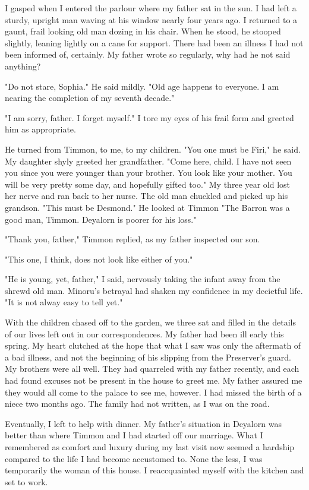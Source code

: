 \documentclass{article}
\begin{document}
I gasped when I entered the parlour where my father sat in the sun. I had left a sturdy, upright man waving at his window nearly four years ago. I returned to a gaunt, frail looking old man dozing in his chair. When he stood, he stooped slightly, leaning lightly on a cane for support. There had been an illness I had not been informed of, certainly. My father wrote so regularly, why had he not said anything?

"Do not stare, Sophia." He said mildly. "Old age happens to everyone. I am nearing the completion of my seventh decade."

"I am sorry, father. I forget myself." I tore my eyes of his frail form and greeted him as appropriate. 

He turned from Timmon, to me, to my children. "You one must be Firi," he said. My daughter shyly greeted her grandfather. "Come here, child. I have not seen you since you were younger than your brother. You look like your mother. You will be very pretty some day, and hopefully gifted too." My three year old lost her nerve and ran back to her nurse. The old man chuckled and picked up his grandson. "This must be Desmond." He looked at Timmon "The Barron was a good man, Timmon. Deyalorn is poorer for his loss." 

"Thank you, father," Timmon replied, as my father inspected our son.

"This one, I think, does not look like either of you." 

"He is young, yet, father," I said, nervously taking the infant away from the shrewd old man. Minoru's betrayal had shaken my confidence in my decietful life. "It is not alway easy to tell yet."

With the children chased off to the garden, we three sat and filled in the details of our lives left out in our correspondences. My father had been ill early this spring. My heart clutched at the hope that what I saw was only the aftermath of a bad illness, and not the beginning of his slipping from the Preserver's guard. My brothers were all well. They had quarreled with my father recently, and each had found excuses not be present in the house to greet me. My father assured me they would all come to the palace to see me, however. I had missed the birth of a niece two months ago. The family had not written, as I was on the road.

Eventually, I left to help with dinner. My father's situation in Deyalorn was better than where Timmon and I had started off our marriage. What I remembered as comfort and luxury during my last visit now seemed a hardship compared to the life I had become accustomed to. None the less, I was temporarily the woman of this house. I reaccquainted myself with the kitchen and set to work.
\end{document}
